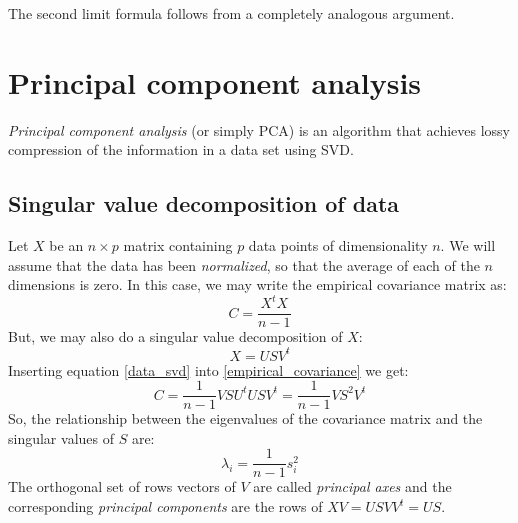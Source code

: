 \documentclass[12pt, a4paper]{article}
\numberwithin{equation}{section}
\begin{document}
The second limit formula follows from a completely analogous argument.

\section{Principal component analysis}
\textit{Principal component analysis} (or simply PCA) is an algorithm that achieves lossy compression of the information in a data set using SVD.

\subsection{Singular value decomposition of data}
Let $X$ be an $n\times p$ matrix containing $p$ data points of dimensionality $n$. We will assume that the data has been \textit{normalized}, so that the average of each of the $n$ dimensions is zero. In this case, we may write the empirical covariance matrix as:
\begin{equation}
\label{empirical_covariance}
C=\frac{X^t X}{n-1}
\end{equation} 
But, we may also do a singular value decomposition of $X$:
\begin{equation}
\label{data_svd}
X=USV^t
\end{equation}
Inserting equation \ref{data_svd} into \ref{empirical_covariance} we get:
\begin{equation}
C=\frac{1}{n-1}VSU^t USV^t=\frac{1}{n-1}VS^2 V^t
\end{equation}
So, the relationship between the eigenvalues of the covariance matrix and the singular values of $S$ are:
\begin{equation}
\lambda_i=\frac{1}{n-1}s_i^2
\end{equation}
The orthogonal set of rows vectors of $V$ are called \textit{principal axes} and the corresponding \textit{principal components} are the rows of $XV=USVV^t=US$.
\end{document}
